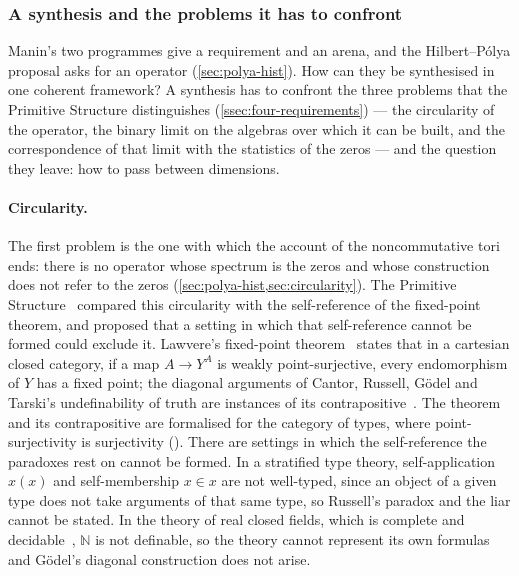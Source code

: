 \subsubsection{A synthesis and the problems it has to confront}\label{ssec:intro-binary}

Manin's two programmes give a requirement and an arena, and the Hilbert--P\'olya proposal asks for an operator
(\cref{sec:polya-hist}).  How can they be synthesised in one coherent framework?  A synthesis has to confront the
three problems that the Primitive Structure distinguishes (\cref{ssec:four-requirements}) --- the circularity of
the operator, the binary limit on the algebras over which it can be built, and the correspondence of that limit
with the statistics of the zeros --- and the question they leave: how to pass between dimensions.

\medskip
\paragraph{Circularity.}
The first problem is the one with which the account of the noncommutative tori ends: there is no operator whose spectrum is the zeros and
whose construction does not refer to the zeros (\cref{sec:polya-hist,sec:circularity}).  The Primitive
Structure~\cite{gonzalez25hp} compared this circularity with the self-reference of the fixed-point theorem, and
proposed that a setting in which that self-reference cannot be formed could exclude it.
Lawvere's fixed-point theorem~\cite{lawvere69} states that in a cartesian closed
category, if a map $A\to Y^{A}$ is weakly point-surjective, every endomorphism of
$Y$ has a fixed point; the diagonal arguments of Cantor, Russell, G\"odel and
Tarski's undefinability of truth are instances of its
contrapositive~\cite{lawvere69,yanofsky03}.  The theorem and its contrapositive
are formalised for the category of types, where point-surjectivity is
surjectivity ().  There are
settings in which the self-reference the paradoxes rest on cannot be formed.  In a
stratified type theory, self-application $x(x)$ and self-membership $x\in x$ are
not well-typed, since an object of a given type does not take arguments of that
same type, so Russell's paradox and the liar cannot be stated.  In the theory of
real closed fields, which is complete and decidable~\cite{tarski1951},
$\mathbb{N}$ is not definable, so the theory cannot represent its own formulas
and G\"odel's diagonal construction does not arise.

